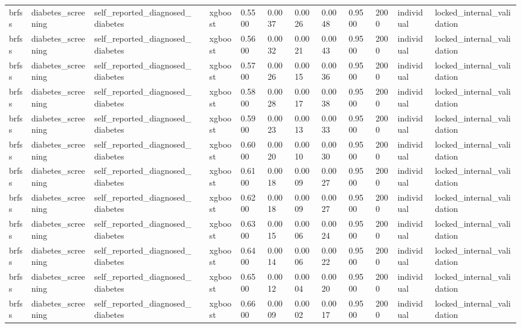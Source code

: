 \begin{tabular}{lllllllllllll}
brfss & diabetes\_screening & self\_reported\_diagnosed\_diabetes &  & xgboost & 0.5500 & 0.0037 & 0.0026 & 0.0048 & 0.9500 & 2000 & individual & locked\_internal\_validation \\
brfss & diabetes\_screening & self\_reported\_diagnosed\_diabetes &  & xgboost & 0.5600 & 0.0032 & 0.0021 & 0.0043 & 0.9500 & 2000 & individual & locked\_internal\_validation \\
brfss & diabetes\_screening & self\_reported\_diagnosed\_diabetes &  & xgboost & 0.5700 & 0.0026 & 0.0015 & 0.0036 & 0.9500 & 2000 & individual & locked\_internal\_validation \\
brfss & diabetes\_screening & self\_reported\_diagnosed\_diabetes &  & xgboost & 0.5800 & 0.0028 & 0.0017 & 0.0038 & 0.9500 & 2000 & individual & locked\_internal\_validation \\
brfss & diabetes\_screening & self\_reported\_diagnosed\_diabetes &  & xgboost & 0.5900 & 0.0023 & 0.0013 & 0.0033 & 0.9500 & 2000 & individual & locked\_internal\_validation \\
brfss & diabetes\_screening & self\_reported\_diagnosed\_diabetes &  & xgboost & 0.6000 & 0.0020 & 0.0010 & 0.0030 & 0.9500 & 2000 & individual & locked\_internal\_validation \\
brfss & diabetes\_screening & self\_reported\_diagnosed\_diabetes &  & xgboost & 0.6100 & 0.0018 & 0.0009 & 0.0027 & 0.9500 & 2000 & individual & locked\_internal\_validation \\
brfss & diabetes\_screening & self\_reported\_diagnosed\_diabetes &  & xgboost & 0.6200 & 0.0018 & 0.0009 & 0.0027 & 0.9500 & 2000 & individual & locked\_internal\_validation \\
brfss & diabetes\_screening & self\_reported\_diagnosed\_diabetes &  & xgboost & 0.6300 & 0.0015 & 0.0006 & 0.0024 & 0.9500 & 2000 & individual & locked\_internal\_validation \\
brfss & diabetes\_screening & self\_reported\_diagnosed\_diabetes &  & xgboost & 0.6400 & 0.0014 & 0.0006 & 0.0022 & 0.9500 & 2000 & individual & locked\_internal\_validation \\
brfss & diabetes\_screening & self\_reported\_diagnosed\_diabetes &  & xgboost & 0.6500 & 0.0012 & 0.0004 & 0.0020 & 0.9500 & 2000 & individual & locked\_internal\_validation \\
brfss & diabetes\_screening & self\_reported\_diagnosed\_diabetes &  & xgboost & 0.6600 & 0.0009 & 0.0002 & 0.0017 & 0.9500 & 2000 & individual & locked\_internal\_validation \\

\end{tabular}
